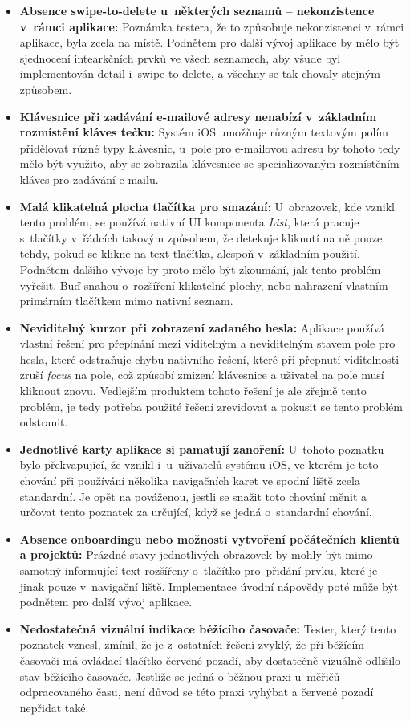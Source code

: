 \begin{itemize}
\item\textbf{Absence swipe-to-delete u~některých seznamů – nekonzistence v~rámci aplikace:} Poznámka testera, že to způsobuje nekonzistenci v~rámci aplikace, byla zcela na místě. Podnětem pro další vývoj aplikace by mělo být sjednocení intearkčních prvků ve všech seznamech, aby všude byl implementován detail i~swipe-to-delete, a všechny se tak chovaly stejným způsobem.
\item\textbf{Klávesnice při zadávání e-mailové adresy nenabízí v~základním rozmístění kláves tečku:} Systém iOS umožňuje různým textovým polím přidělovat různé typy klávesnic, u~pole pro e-mailovou adresu by tohoto tedy mělo být využito, aby se zobrazila klávesnice se specializovaným rozmístěním kláves pro zadávání e-mailu.
\item\textbf{Malá klikatelná plocha tlačítka pro smazání:} U~obrazovek, kde vznikl tento problém, se používá nativní UI komponenta \emph{List}, která pracuje s~tlačítky v~řádcích takovým způsobem, že detekuje kliknutí na ně pouze tehdy, pokud se klikne na text tlačítka, alespoň v~základním použití. Podnětem dalšího vývoje by proto mělo být zkoumání, jak tento problém vyřešit. Buď snahou o~rozšíření klikatelné plochy, nebo nahrazení vlastním primárním tlačítkem mimo nativní seznam.
\item\textbf{Neviditelný kurzor při zobrazení zadaného hesla:} Aplikace používá vlastní řešení pro přepínání mezi viditelným a neviditelným stavem pole pro hesla, které odstraňuje chybu nativního řešení, které při přepnutí viditelnosti zruší \emph{focus} na pole, což způsobí zmizení klávesnice a uživatel na pole musí kliknout znovu. Vedlejším produktem tohoto řešení je ale zřejmě tento problém, je tedy potřeba použité řešení zrevidovat a pokusit se tento problém odstranit.
\item\textbf{Jednotlivé karty aplikace si pamatují zanoření:} U~tohoto poznatku bylo překvapující, že vznikl i~u~uživatelů systému iOS, ve kterém je toto chování při používání několika navigačních karet ve spodní liště zcela standardní. Je opět na pováženou, jestli se snažit toto chování měnit a určovat tento poznatek za určující, když se jedná o~standardní chování.
\item\textbf{Absence onboardingu nebo možnosti vytvoření počátečních klientů a projektů:} Prázdné stavy jednotlivých obrazovek by mohly být mimo samotný informující text rozšířeny o~tlačítko pro~přidání prvku, které je jinak pouze v~navigační liště. Implementace úvodní nápovědy poté může být podnětem pro další vývoj aplikace.
\item\textbf{Nedostatečná vizuální indikace běžícího časovače:} Tester, který tento poznatek vznesl, zmínil, že je z~ostatních řešení zvyklý, že při běžícím časovači má ovládací tlačítko červené pozadí, aby dostatečně vizuálně odlišilo stav běžícího časovače. Jestliže se jedná o běžnou praxi u~měřičů odpracovaného času, není důvod se této praxi vyhýbat a červené pozadí nepřidat také.

\end{itemize}
